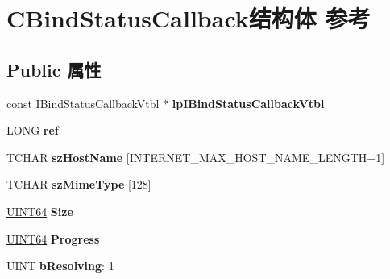 \hypertarget{struct_c_bind_status_callback}{}\section{C\+Bind\+Status\+Callback结构体 参考}
\label{struct_c_bind_status_callback}
\subsection*{Public 属性}
\begin{DoxyCompactItemize}
\item 
\mbox{\label{struct_c_bind_status_callback_a474fbd8635777d908b3bd4fe0eaf9779}} 
const I\+Bind\+Status\+Callback\+Vtbl $\ast$ {\bfseries lp\+I\+Bind\+Status\+Callback\+Vtbl}
\item 
\mbox{\label{struct_c_bind_status_callback_a31619257660fbf43d13d173aef96c628}} 
L\+O\+NG {\bfseries ref}
\item 
\mbox{\label{struct_c_bind_status_callback_a2b73077010d12722d54f4e0a33176c37}} 
T\+C\+H\+AR {\bfseries sz\+Host\+Name} \mbox{[}I\+N\+T\+E\+R\+N\+E\+T\+\_\+\+M\+A\+X\+\_\+\+H\+O\+S\+T\+\_\+\+N\+A\+M\+E\+\_\+\+L\+E\+N\+G\+TH+1\mbox{]}
\item 
\mbox{\label{struct_c_bind_status_callback_a5a05e7bbb535c7e32c738e6bc949a00a}} 
T\+C\+H\+AR {\bfseries sz\+Mime\+Type} \mbox{[}128\mbox{]}
\item 
\mbox{\label{struct_c_bind_status_callback_a8780fb81bbf0240a520e0c3b5da8ea53}} 
\hyperlink{_processor_bind_8h_a57be03562867144161c1bfee95ca8f7c}{U\+I\+N\+T64} {\bfseries Size}
\item 
\mbox{\label{struct_c_bind_status_callback_aac8076d45118f16ec94faacf60b820e3}} 
\hyperlink{_processor_bind_8h_a57be03562867144161c1bfee95ca8f7c}{U\+I\+N\+T64} {\bfseries Progress}
\item 
\mbox{\label{struct_c_bind_status_callback_a86993dc932df618e7ba5e013bf072e8b}} 
U\+I\+NT {\bfseries b\+Resolving}\+: 1
\item 

\end{DoxyCompactItemize}
